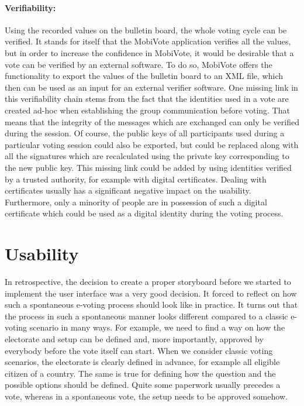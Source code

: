 \documentclass[numbers=noenddot, abstract=on, a4paper, headsepline,
footsepline, oneside, openright, draft=off, listof=leveldown]{scrreprt}
\begin{document}
\paragraph{Verifiability:} Using the recorded values on the bulletin board, the
whole voting cycle can be verified. It stands for itself that the MobiVote
application verifies all the values, but in order to increase the confidence in
MobiVote, it would be desirable that a vote can be verified by an external
software. To do so, MobiVote offers the functionality to export the values of
the bulletin board to an XML file, which then can be used as an input for an
external verifier software.
One missing link in this verifiability chain stems from the fact that the
identities used in a vote are created ad-hoc when establishing the group
communication before voting. That means that the integrity of the messages which
are exchanged can only be verified during the session. Of course, the public
keys of all participants used during a particular voting session could also be
exported, but could be replaced along with all the signatures which are
recalculated using the private key corresponding to the new public key. This
missing link could be added by using identities verified by a trusted authority,
for example with digital certificates. Dealing with certificates usually has a
significant negative impact on the usability. Furthermore, only a minority of
people are in possession of such a digital certificate which could be used as a
digital identity during the voting process. 

\section{Usability}
\label{sec:discusionusability}
In retrospective, the decision to create a proper storyboard before we started
to implement the user interface was a very good decision. It forced to reflect
on how such a spontaneous e-voting process should look like in practice. It turns
out that the process in such a spontaneous manner looks different compared to a
classic e-voting scenario in many ways. For example, we need to find a way on
how the electorate and setup can be defined and, more importantly, approved
by everybody before the vote itself can start. When we consider classic voting
scenarios, the electorate is clearly defined in advance, for example all
eligible citizen of a country. The same is true for defining how the question
and the possible options should be defined. Quite some paperwork usually
precedes a vote, whereas in a spontaneous vote, the setup needs to be approved
somehow.
\end{document}

